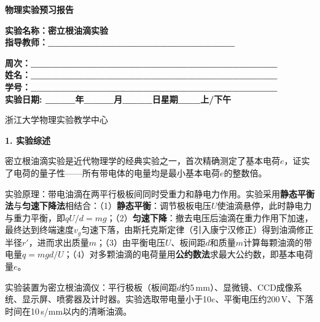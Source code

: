 \documentclass[a4paper,12pt]{article}
\begin{document}
\begin{center}
    \vspace*{2cm}
    {\fontsize{36pt}{43pt}\selectfont \textbf{物理实验预习报告}}
    \vspace{3cm}
\end{center}

\begin{center}
    \fontsize{16pt}{24pt}\selectfont
    \textbf{实验名称：密立根油滴实验\quad} \\[0.5em]
    \textbf{指导教师：\_\_\_\_\_\_\_\_\_\_\_\_\_\_\_\_\_\_\_\_\_\_\_\_\_}
\end{center}

\vspace{2cm}

\begin{center}
    \fontsize{14pt}{28pt}\selectfont
    \textbf{周次：\_\_\_\_\_\_\_\_\_\_\_\_\_\_\_\_\_\_\_\_\_\_\_\_\_\_\_\_\_\_\_\_\_} \\
    \textbf{姓名：\_\_\_\_\_\_\_\_\_\_\_\_\_\_\_\_\_\_\_\_\_\_\_\_\_\_\_\_\_\_\_\_\_} \\
    \textbf{学号：\_\_\_\_\_\_\_\_\_\_\_\_\_\_\_\_\_\_\_\_\_\_\_\_\_\_\_\_\_\_\_\_\_} \\[0.5em]
    \textbf{实验日期: \_\_\_\_年\_\_\_\_月\_\_\_\_日\quad 星期\_\_\_上/下午}
\end{center}

\vspace{1.5cm}

\begin{center}
    \fontsize{14pt}{20pt}\selectfont
    浙江大学物理实验教学中心
\end{center}

\newpage


{\fontsize{14pt}{20pt}\selectfont \textbf{1. 实验综述}}

\vspace{0.3cm}

{\fontsize{12pt}{18pt}\selectfont

密立根油滴实验是近代物理学的经典实验之一，首次精确测定了基本电荷$e$，证实了电荷的量子性——所有带电体的电量均是最小基本电荷$e$的整数倍。

实验原理：带电油滴在两平行极板间同时受重力和静电力作用。实验采用\textbf{静态平衡法}与\textbf{匀速下降法}相结合：（1）\textbf{静态平衡}：调节极板电压$U$使油滴悬停，此时静电力与重力平衡，即$qU/d = mg$；（2）\textbf{匀速下降}：撤去电压后油滴在重力作用下加速，最终达到终端速度$v_g$匀速下落，由斯托克斯定律（引入康宁汉修正）得到油滴修正半径$r'$，进而求出质量$m$；（3）由平衡电压$U$、板间距$d$和质量$m$计算每颗油滴的带电量$q = mgd/U$；（4）对多颗油滴的电荷量用\textbf{公约数法}求最大公约数，即基本电荷量$e$。

实验装置为密立根油滴仪：平行极板（板间距$d$约5\,mm）、显微镜、CCD成像系统、显示屏、喷雾器及计时器。实验选取带电量小于10$e$、平衡电压约200\,V、下落时间在10\,s/mm以内的清晰油滴。

}
\end{document}
